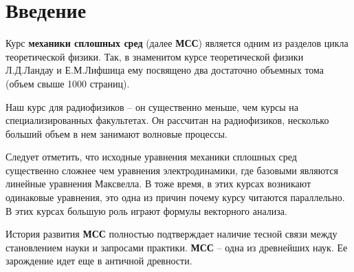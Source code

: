 \section{Введение}

Курс \textbf{механики сплошных сред} (далее \textbf{\textbf{МСС}}) является одним из разделов цикла теоретической физики.  Так, в знаменитом курсе теоретической физики Л.Д.Ландау и Е.М.Лифшица  ему посвящено два достаточно объемных тома (объем свыше 1000 страниц).

Наш курс для радиофизиков -- он существенно меньше, чем курсы на специализированных факультетах. Он рассчитан на радиофизиков, несколько больший объем в нем занимают волновые процессы.

Следует отметить, что исходные уравнения механики сплошных сред существенно сложнее чем уравнения электродинамики, где базовыми являются линейные уравнения Максвелла. В тоже время, в этих курсах возникают одинаковые уравнения, это одна из причин почему курсу читаются параллельно. В этих курсах большую роль играют формулы векторного анализа.

История развития \textbf{МСС} полностью подтверждает наличие тесной связи между становлением науки и запросами практики.  
\textbf{МСС} -- одна из древнейших наук. Ее зарождение идет еще в античной древности.

